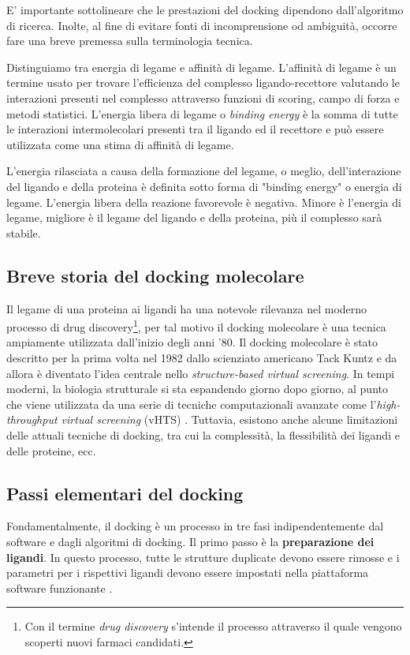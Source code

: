 E' importante sottolineare che le prestazioni del docking dipendono dall'algoritmo di ricerca. Inolte, al fine di evitare fonti di incomprensione od ambiguità, occorre fare una breve premessa sulla terminologia tecnica.


Distinguiamo tra energia di legame e affinità di legame.
L'affinità di legame è un termine usato per trovare l'efficienza del complesso ligando-recettore valutando le interazioni presenti nel complesso attraverso funzioni di scoring, campo di forza e metodi statistici.
L'energia libera di legame o \textit{binding energy} è la somma di tutte le interazioni intermolecolari presenti tra il ligando ed il recettore e può essere utilizzata come una stima di affinità di legame.

L'energia rilasciata a causa della formazione del legame, o meglio, dell'interazione del ligando e della proteina è definita sotto forma di "binding energy" o energia di legame. L'energia libera della reazione favorevole è negativa. Minore è l'energia di legame, migliore è il legame del ligando e della proteina, più il complesso sarà stabile.

\subsection{Breve storia del docking molecolare}
Il legame di una proteina ai ligandi ha una notevole rilevanza nel moderno processo di drug discovery\footnote{Con il termine \textit{drug discovery} s'intende il processo attraverso il quale vengono scoperti nuovi farmaci candidati.}, per tal motivo il docking molecolare è una tecnica ampiamente utilizzata dall'inizio degli anni '80.
Il docking molecolare è stato descritto per la prima volta nel 1982 dallo scienziato americano Tack Kuntz e da allora è diventato l'idea centrale nello \textit{structure-based virtual screening}.
In tempi moderni, la biologia strutturale si sta espandendo giorno dopo giorno, al punto che viene utilizzata da una serie di tecniche computazionali avanzate come l'\textit{high-throughput virtual screening} (vHTS) \cite{noauthor_chapter_nodate,naqvi_advancements_nodate}.
Tuttavia, esistono anche alcune limitazioni delle attuali tecniche di docking, tra cui la complessità, la flessibilità dei ligandi e delle proteine, ecc. \cite{naqvi_advancements_nodate}


\subsection{Passi elementari del docking}
Fondamentalmente, il docking è un processo in tre fasi indipendentemente dal software e dagli algoritmi di docking. 
Il primo passo è la \textbf{preparazione dei ligandi}. In questo processo, tutte le strutture duplicate devono essere rimosse e i parametri per i rispettivi ligandi devono essere impostati nella piattaforma software funzionante \cite{roy_chapter_2015}.

